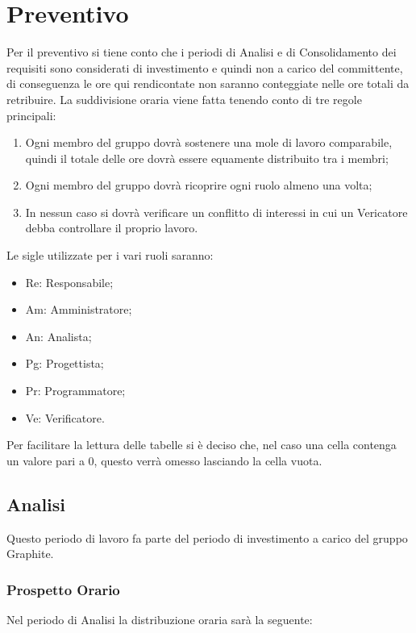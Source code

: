 \documentclass[./PianodiProgetto.tex]{subfiles}
\begin{document}
	
\chapter{Preventivo}
Per il preventivo si tiene conto che i periodi di Analisi e di Consolidamento dei requisiti sono considerati di investimento e quindi non a carico del committente, di conseguenza le ore qui rendicontate non saranno conteggiate nelle ore totali da retribuire.
La suddivisione oraria viene fatta tenendo conto di tre regole principali:
\begin{enumerate}
\item Ogni membro del gruppo dovrà sostenere una mole di lavoro comparabile, quindi il totale delle ore dovrà essere equamente distribuito tra i membri;
\item Ogni membro del gruppo dovrà ricoprire ogni ruolo almeno una volta;
\item In nessun caso si dovrà verificare un conflitto di interessi in cui un Vericatore debba controllare il proprio lavoro.
\end{enumerate}
Le sigle utilizzate per i vari ruoli saranno:
\begin{itemize}
\item Re: Responsabile;
\item Am: Amministratore;
\item An: Analista;
\item Pg: Progettista;
\item Pr: Programmatore;
\item Ve: Verificatore.
\end{itemize}
Per facilitare la lettura delle tabelle si è deciso che, nel caso una cella contenga un valore pari a 0, questo verrà omesso lasciando la cella vuota.

\section{Analisi}
Questo periodo di lavoro fa parte del periodo di investimento a carico del gruppo Graphite.
\subsection{Prospetto Orario}
Nel periodo di Analisi la distribuzione oraria sarà la seguente:
\end{document}

